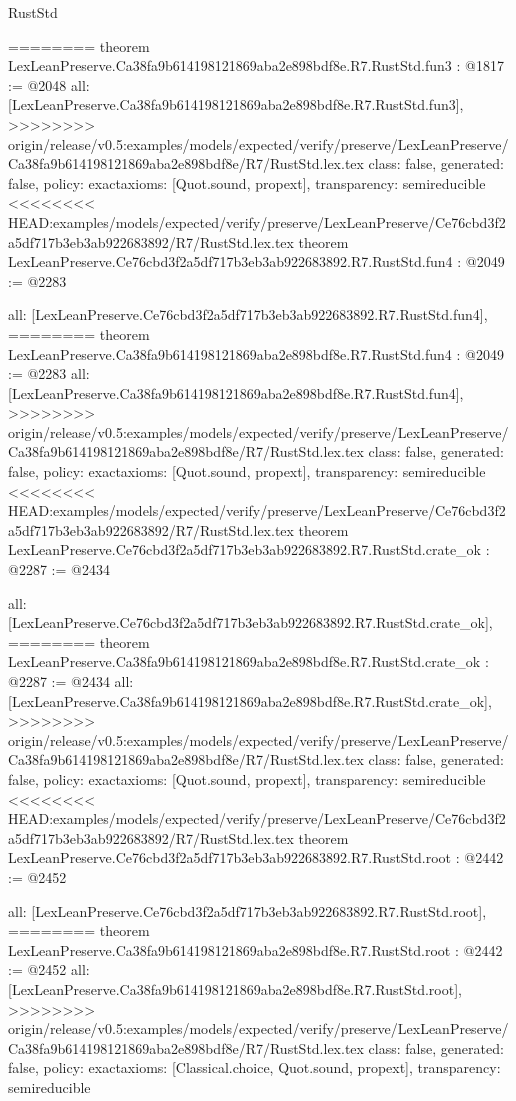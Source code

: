 \begin{lexlean}{RustStd}
\begin{coremodule}
{\begin{coremodule}
{{{{{{========
theorem LexLeanPreserve.Ca38fa9b614198121869aba2e898bdf8e.R7.RustStd.fun3 : @1817 := @2048 {
  all: [LexLeanPreserve.Ca38fa9b614198121869aba2e898bdf8e.R7.RustStd.fun3],
>>>>>>>> origin/release/v0.5:examples/models/expected/verify/preserve/LexLeanPreserve/Ca38fa9b614198121869aba2e898bdf8e/R7/RustStd.lex.tex
  class: false,
  generated: false,
  policy: exact{axioms: [Quot.sound, propext]},
  transparency: semireducible
}
<<<<<<<< HEAD:examples/models/expected/verify/preserve/LexLeanPreserve/Ce76cbd3f2a5df717b3eb3ab922683892/R7/RustStd.lex.tex
theorem LexLeanPreserve.Ce76cbd3f2a5df717b3eb3ab922683892.R7.RustStd.fun4 : @2049 := @2283 {
  all: [LexLeanPreserve.Ce76cbd3f2a5df717b3eb3ab922683892.R7.RustStd.fun4],
========
theorem LexLeanPreserve.Ca38fa9b614198121869aba2e898bdf8e.R7.RustStd.fun4 : @2049 := @2283 {
  all: [LexLeanPreserve.Ca38fa9b614198121869aba2e898bdf8e.R7.RustStd.fun4],
>>>>>>>> origin/release/v0.5:examples/models/expected/verify/preserve/LexLeanPreserve/Ca38fa9b614198121869aba2e898bdf8e/R7/RustStd.lex.tex
  class: false,
  generated: false,
  policy: exact{axioms: [Quot.sound, propext]},
  transparency: semireducible
}
<<<<<<<< HEAD:examples/models/expected/verify/preserve/LexLeanPreserve/Ce76cbd3f2a5df717b3eb3ab922683892/R7/RustStd.lex.tex
theorem LexLeanPreserve.Ce76cbd3f2a5df717b3eb3ab922683892.R7.RustStd.crate_ok : @2287 := @2434 {
  all: [LexLeanPreserve.Ce76cbd3f2a5df717b3eb3ab922683892.R7.RustStd.crate_ok],
========
theorem LexLeanPreserve.Ca38fa9b614198121869aba2e898bdf8e.R7.RustStd.crate_ok : @2287 := @2434 {
  all: [LexLeanPreserve.Ca38fa9b614198121869aba2e898bdf8e.R7.RustStd.crate_ok],
>>>>>>>> origin/release/v0.5:examples/models/expected/verify/preserve/LexLeanPreserve/Ca38fa9b614198121869aba2e898bdf8e/R7/RustStd.lex.tex
  class: false,
  generated: false,
  policy: exact{axioms: [Quot.sound, propext]},
  transparency: semireducible
}
<<<<<<<< HEAD:examples/models/expected/verify/preserve/LexLeanPreserve/Ce76cbd3f2a5df717b3eb3ab922683892/R7/RustStd.lex.tex
theorem LexLeanPreserve.Ce76cbd3f2a5df717b3eb3ab922683892.R7.RustStd.root : @2442 := @2452 {
  all: [LexLeanPreserve.Ce76cbd3f2a5df717b3eb3ab922683892.R7.RustStd.root],
========
theorem LexLeanPreserve.Ca38fa9b614198121869aba2e898bdf8e.R7.RustStd.root : @2442 := @2452 {
  all: [LexLeanPreserve.Ca38fa9b614198121869aba2e898bdf8e.R7.RustStd.root],
>>>>>>>> origin/release/v0.5:examples/models/expected/verify/preserve/LexLeanPreserve/Ca38fa9b614198121869aba2e898bdf8e/R7/RustStd.lex.tex
  class: false,
  generated: false,
  policy: exact{axioms: [Classical.choice, Quot.sound, propext]},
  transparency: semireducible
}

}}}}}}}}}
\end{coremodule}}
\end{coremodule}
\end{lexlean}
